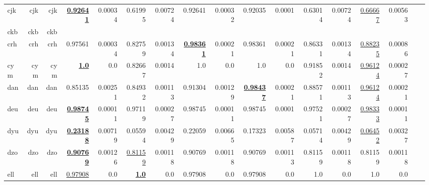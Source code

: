 \documentclass[11pt]{article}
\begin{document}
\begin{table*}[h]
{\begin{tabular}{lrrrrrrrrrrrrrrrr}
cjk         & cjk         & cjk         & \textbf{\underline{0.92641}}         & 0.00034         & 0.61995         & 0.00724         & 0.92641         & 0.00032         & 0.92035         & 0.0001         & 0.63014         & 0.00724         & \underline{0.66667}         & 0.00563         \\
ckb         & ckb         & ckb         &         &          &          &          &         &          &         &          &          &          &          &          \\
crh         & crh         & crh         & 0.97561         & 0.00034         & 0.82759         & 0.00134         & \textbf{\underline{0.98361}}         & 0.00021         & 0.98361         & 0.00021         & 0.86331         & 0.00134         & \underline{0.88235}         & 0.00086         \\
cym         & cym         & cym         & \textbf{\underline{1.0}}         & 0.0         & 0.82667         & 0.0014         & 1.0         & 0.0         & 1.0         & 0.0         & 0.91852         & 0.0014         & \underline{0.96124}         & 0.00027         \\
dan         & dan         & dan         & 0.85135         & 0.00251         & 0.84932         & 0.00113         & 0.91304         & 0.00129         & \textbf{\underline{0.98437}}         & 0.00021         & 0.88571         & 0.00113         & \underline{0.96124}         & 0.00021         \\
deu         & deu         & deu         & \textbf{\underline{0.98745}}         & 0.00011         & 0.97119         & 0.00027         & 0.98745         & 0.00011         & 0.98745         & 0.0001         & 0.97521         & 0.00027         & \underline{0.98333}         & 0.00011         \\
dyu         & dyu         & dyu         & \textbf{\underline{0.23188}}         & 0.00719         & 0.05594         & 0.00429         & 0.22059         & 0.00665         & 0.17323         & 0.00587         & 0.05714         & 0.00429         & \underline{0.06452}         & 0.00327         \\
dzo         & dzo         & dzo         & \textbf{\underline{0.90769}}         & 0.00126         & \underline{0.81159}         & 0.00118         & 0.90769         & 0.00118         & 0.90769         & 0.00113         & 0.81159         & 0.00118         & 0.81159         & 0.00118         \\
ell         & ell         & ell         & \underline{0.97908}         & 0.0         & \textbf{\underline{1.0}}         & 0.0         & 0.97908         & 0.0         & 0.97908         & 0.0         & 1.0         & 0.0         & 1.0         & 0.0         \\

\end{tabular}}
\end{table*}
\end{document}
